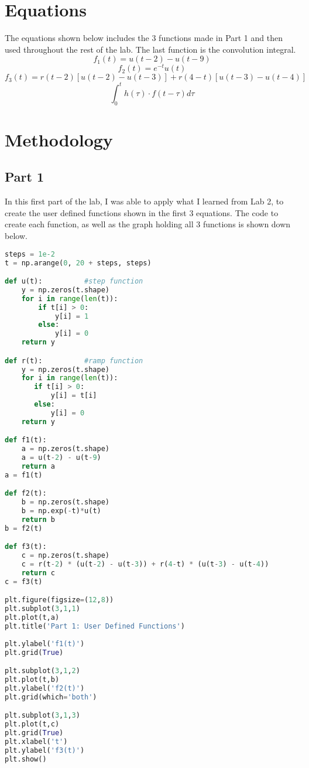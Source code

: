 \documentclass[12pt]{report}
\begin{document}
\section{Equations}
The equations shown below includes the 3 functions made in Part 1 and then
used throughout the rest of the lab. The last function is the convolution
integral.
\begin{equation}
    f_{1}(t) = u(t-2) - u(t-9)
\end{equation}
\begin{equation}
    f_{2}(t) = e^{-t}u(t)
\end{equation}
\begin{equation}
    f_{3}(t) = r(t-2)[u(t-2) - u(t-3)] + r(4-t)[u(t-3) - u(t-4)]
\end{equation}
\begin{equation}
    \int_{0}^{t} h(\tau)\cdot f(t-\tau) d\tau 
\end{equation}
\section{Methodology}
\subsection{Part 1}
In this first part of the lab, I was able to apply what I learned from
Lab 2, to create the user defined functions shown in the first 3 equations.
The code to create each function, as well as the graph holding all 3
functions is shown down below.

\begin{lstlisting}[language=Python]
steps = 1e-2
t = np.arange(0, 20 + steps, steps)

def u(t):          #step function
    y = np.zeros(t.shape)
    for i in range(len(t)):
        if t[i] > 0:
            y[i] = 1
        else:
            y[i] = 0
    return y

def r(t):          #ramp function
    y = np.zeros(t.shape)
    for i in range(len(t)):
       if t[i] > 0:
           y[i] = t[i]
       else:
           y[i] = 0
    return y

def f1(t):
    a = np.zeros(t.shape)
    a = u(t-2) - u(t-9)
    return a
a = f1(t)

def f2(t):
    b = np.zeros(t.shape)
    b = np.exp(-t)*u(t)
    return b
b = f2(t)

def f3(t):
    c = np.zeros(t.shape)
    c = r(t-2) * (u(t-2) - u(t-3)) + r(4-t) * (u(t-3) - u(t-4))
    return c
c = f3(t)

plt.figure(figsize=(12,8))
plt.subplot(3,1,1)
plt.plot(t,a)
plt.title('Part 1: User Defined Functions') 
                                 
plt.ylabel('f1(t)')
plt.grid(True)

plt.subplot(3,1,2)
plt.plot(t,b)
plt.ylabel('f2(t)') 
plt.grid(which='both')

plt.subplot(3,1,3)
plt.plot(t,c)
plt.grid(True)
plt.xlabel('t') 
plt.ylabel('f3(t)') 
plt.show() 
\end{lstlisting}
\newpage
\end{document}
